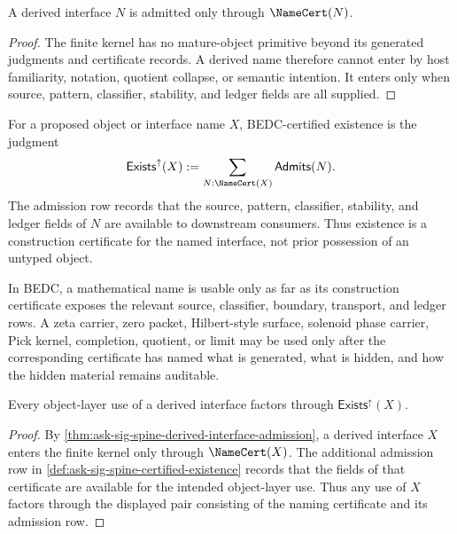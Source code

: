 \begin{theorem}
\label{thm:ask-sig-spine-derived-interface-admission}
A derived interface $N$ is admitted only through $\NameCert(N)$.
\end{theorem}

\begin{proof}
The finite kernel has no mature-object primitive beyond its generated
judgments and certificate records.  A derived name therefore cannot enter by
host familiarity, notation, quotient collapse, or semantic intention.  It
enters only when source, pattern, classifier, stability, and ledger fields
are all supplied.
\end{proof}

\begin{definition}
\label{def:ask-sig-spine-certified-existence}
For a proposed object or interface name $X$, BEDC-certified existence is
the judgment
$$
\mathsf{Exists}^{\uparrow}(X)
:=
\sum_{N:\NameCert(X)}
\mathsf{Admits}(N).
$$
The admission row records that the source, pattern, classifier,
stability, and ledger fields of $N$ are available to downstream
consumers. Thus existence is a construction certificate for the named
interface, not prior possession of an untyped object.
\end{definition}

\begin{principle}
\label{prin:ask-sig-spine-existence-certificate-bearing}
In BEDC, a mathematical name is usable only as far as its construction
certificate exposes the relevant source, classifier, boundary, transport,
and ledger rows. A zeta carrier, zero packet, Hilbert-style surface,
solenoid phase carrier, Pick kernel, completion, quotient, or limit may be
used only after the corresponding certificate has named what is generated,
what is hidden, and how the hidden material remains auditable.
\end{principle}

\begin{theorem}
\label{thm:ask-sig-spine-certified-existence-admission}
Every object-layer use of a derived interface factors through
$\mathsf{Exists}^{\uparrow}(X)$.
\end{theorem}

\begin{proof}
By \autoref{thm:ask-sig-spine-derived-interface-admission}, a derived
interface $X$ enters the finite kernel only through $\NameCert(X)$. The
additional admission row in
\autoref{def:ask-sig-spine-certified-existence} records that the fields of
that certificate are available for the intended object-layer use. Thus any
use of $X$ factors through the displayed pair consisting of the naming
certificate and its admission row.
\end{proof}

